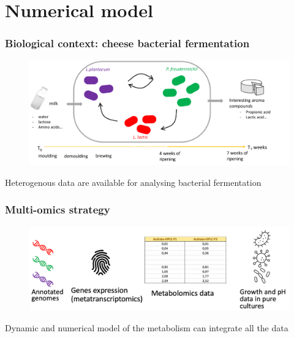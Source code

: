 \documentclass[8pt,usenames,dvipsnames]{beamer}
\begin{document}
\section{Numerical model}
\begin{frame}
\frametitle{Biological context: cheese bacterial fermentation}
\begin{adjustwidth}{-0.8cm}{}
\begin{figure}
\includegraphics[width=1.15\textwidth]{figures/context-cheese}
\end{figure}
\end{adjustwidth}
\begin{block}{}
Heterogenous data are available for analysing bacterial fermentation
\end{block}
\end{frame}

\begin{frame}
\frametitle{Multi-omics strategy}
\begin{adjustwidth}{-0.8cm}{}
\begin{figure}
\includegraphics[width=1.15\textwidth]{figures/multi-omics}
\end{figure}
\end{adjustwidth}
\begin{block}{}
Dynamic and numerical model of the metabolism can integrate all the data
\end{block}
\end{frame}
\end{document}
